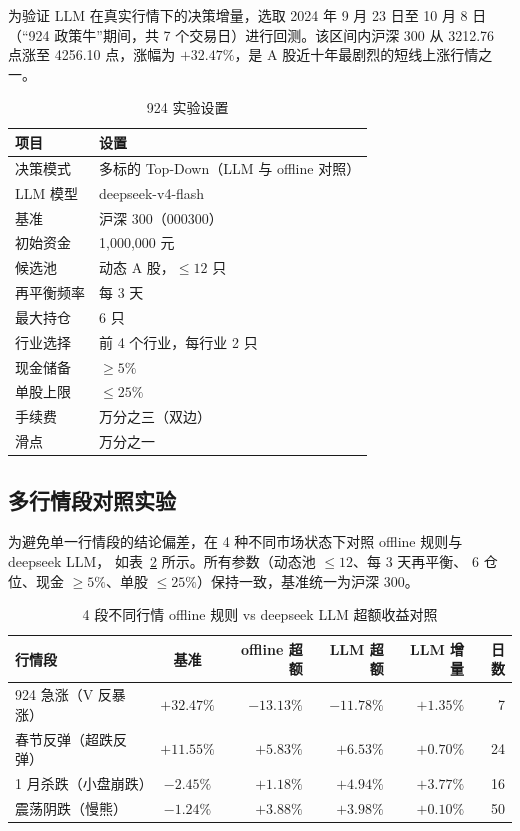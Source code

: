 \documentclass[a4paper,11pt]{article}
\begin{document}
为验证 LLM 在真实行情下的决策增量，选取 2024 年 9 月 23 日至 10 月 8 日
（``924 政策牛''期间，共 7 个交易日）进行回测。该区间内沪深 300 从
3212.76 点涨至 4256.10 点，涨幅为 $+32.47\%$，是 A 股近十年最剧烈的短线上涨行情之一。

\begin{table}[H]
\centering
\caption{924 实验设置}
\begin{tabularx}{0.88\linewidth}{lX}
\toprule
项目 & 设置 \\
\midrule
决策模式 & 多标的 Top-Down（LLM 与 offline 对照） \\
LLM 模型 & deepseek-v4-flash \\
基准 & 沪深 300（000300） \\
初始资金 & 1,000,000 元 \\
候选池 & 动态 A 股，$\leq 12$ 只 \\
再平衡频率 & 每 3 天 \\
最大持仓 & 6 只 \\
行业选择 & 前 4 个行业，每行业 2 只 \\
现金储备 & $\geq 5\%$ \\
单股上限 & $\leq 25\%$ \\
手续费 & 万分之三（双边） \\
滑点 & 万分之一 \\
\bottomrule
\end{tabularx}
\label{tab:experiment-setting}
\end{table}

\subsection{多行情段对照实验}

为避免单一行情段的结论偏差，在 4 种不同市场状态下对照 offline 规则与 deepseek LLM，
如表~\ref{tab:multi-regime} 所示。所有参数（动态池 $\leq 12$、每 3 天再平衡、
6 仓位、现金 $\geq 5\%$、单股 $\leq 25\%$）保持一致，基准统一为沪深 300。

\begin{table}[H]
\centering
\caption{4 段不同行情 offline 规则 vs deepseek LLM 超额收益对照}
\begin{tabularx}{0.98\linewidth}{l c r r r r}
\toprule
行情段 & 基准 & offline 超额 & LLM 超额 & LLM 增量 & 日数 \\
\midrule
924 急涨（V 反暴涨） & $+32.47\%$ & $-13.13\%$ & $-11.78\%$ & $+1.35\%$ & 7 \\
春节反弹（超跌反弹） & $+11.55\%$ & $+5.83\%$ & $+6.53\%$ & $+0.70\%$ & 24 \\
1 月杀跌（小盘崩跌） & $-2.45\%$ & $+1.18\%$ & $+4.94\%$ & $\mathbf{+3.77\%}$ & 16 \\
震荡阴跌（慢熊） & $-1.24\%$ & $+3.88\%$ & $+3.98\%$ & $+0.10\%$ & 50 \\
\bottomrule
\end{tabularx}
\label{tab:multi-regime}
\end{table}
\end{document}
